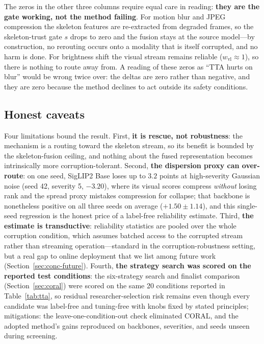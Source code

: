 The zeros in the other three columns require equal care in reading:
\textbf{they are the gate working, not the method failing}. For motion blur
and JPEG compression the skeleton features are re-extracted from degraded
frames, so the skeleton-trust gate $s$ drops to zero and the fusion stays at
the source model---by construction, no rerouting occurs onto a modality that
is itself corrupted, and no harm is done. For brightness shift the visual
stream remains reliable ($w_{\mathrm{vl}} \approx 1$), so there is nothing to
route away from. A reading of these zeros as ``TTA hurts on blur'' would be
wrong twice over: the deltas are zero rather than negative, and they are zero
because the method declines to act outside its safety conditions.

\subsection{Honest caveats}

Four limitations bound the result. First, \textbf{it is rescue, not
robustness}: the mechanism is a routing toward the skeleton stream, so its
benefit is bounded by the skeleton-fusion ceiling, and nothing about the
fused representation becomes intrinsically more corruption-tolerant. Second,
\textbf{the dispersion proxy can over-route}: on one seed, SigLIP2 Base loses
up to $3.2$ points at high-severity Gaussian noise (seed 42, severity 5,
$-3.20$), where its visual scores compress \emph{without} losing rank and the
spread proxy mistakes compression for collapse; that backbone is nonetheless
positive on all three seeds on average ($+1.50\pm1.14$), and this single-seed
regression is the honest price of a label-free reliability estimate. Third,
\textbf{the estimate is transductive}: reliability statistics are pooled over
the whole corruption condition, which assumes batched access to the corrupted
stream rather than streaming operation---standard in the
corruption-robustness setting, but a real gap to online deployment that we
list among future work (Section~\ref{sec:conc-future}). Fourth, \textbf{the
strategy search was scored on the reported test conditions}: the six-strategy
search and finalist comparison (Section~\ref{sec:coral}) were scored on the
same 20 conditions reported in Table~\ref{tab:tta}, so residual
researcher-selection risk remains even though every candidate was label-free
and tuning-free with knobs fixed by stated principles; mitigations: the
leave-one-condition-out check eliminated CORAL, and the adopted method's
gains reproduced on backbones, severities, and seeds unseen during screening.

